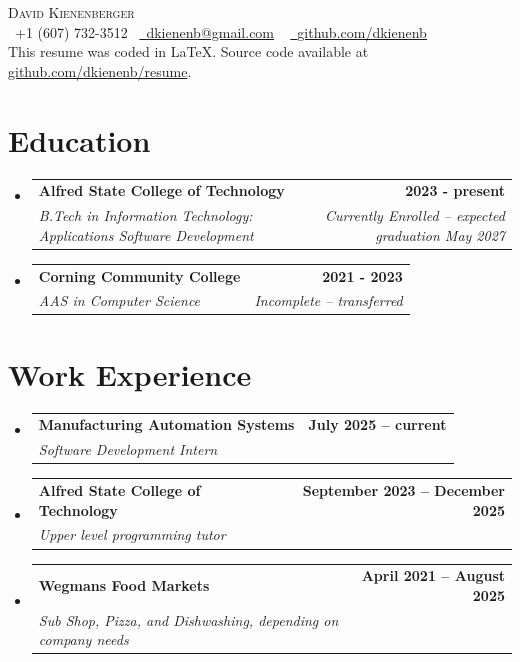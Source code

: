 \documentclass[letterpaper,11pt]{article}
\makeatletter
\newcommand{\resumeSubheading}[4]{
  \vspace{-2pt}\item
    \begin{tabular*}{1.0\textwidth}[t]{l@{\extracolsep{\fill}}r}
      \textbf{#1} & \textbf{\small #2} \\
      \textit{\small#3} & \textit{\small #4} \\
    \end{tabular*}\vspace{-7pt}
}
\newcommand{\resumeSubHeadingListStart}{\begin{itemize}[leftmargin=0.0in, label={}]}
\newcommand{\resumeSubHeadingListEnd}{\end{itemize}}
\makeatother
\begin{document}
\begin{center}
  {\Huge \scshape David Kienenberger} \\ \vspace{5pt}
  \small \raisebox{-0.1\height}\faPhone\ +1 (607) 732-3512~ \href{mailto:dkienenb@gmail.com}{\raisebox{-0.2\height}\faEnvelope\  \underline{dkienenb@gmail.com}} ~
  \href{https://github.com/dkienenb}{\raisebox{-0.2\height}\faGithub\ \underline{github.com/dkienenb}} \\
  \vspace{2pt}
  \footnotesize This resume was coded in \LaTeX. Source code available at \href{https://github.com/dkienenb/resume}{github.com/dkienenb/resume}.
\end{center}

\section{Education}
\resumeSubHeadingListStart
\resumeSubheading
{Alfred State College of Technology}{2023 - present}{B.Tech in Information Technology: Applications Software Development}{Currently Enrolled -- expected graduation May 2027}
\resumeSubheading
{Corning Community College}{2021 - 2023}{AAS in Computer Science}{Incomplete -- transferred}
\resumeSubHeadingListEnd
\vspace{-10pt}



\section{Work Experience}
\resumeSubHeadingListStart
\resumeSubheading
{Manufacturing Automation Systems}{July 2025 -- current}
{Software Development Intern}{}
\resumeSubheading
{Alfred State College of Technology}{September 2023 -- December 2025}
{Upper level programming tutor}{}
\resumeSubheading
{Wegmans Food Markets}{April 2021 -- August 2025}
{Sub Shop, Pizza, and Dishwashing, depending on company needs}{}
\resumeSubHeadingListEnd
\vspace{-10pt}
\end{document}
